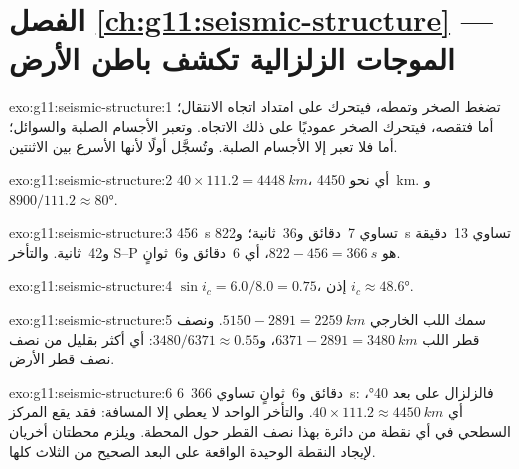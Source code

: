 \section*{الفصل \ref{ch:g11:seismic-structure} --- الموجات الزلزالية تكشف باطن الأرض}

\begin{solution}{exo:g11:seismic-structure:1}
 تضغط الصخر وتمطه، فيتحرك على امتداد اتجاه
الانتقال؛ أما  فتقصه، فيتحرك الصخر عموديًا على ذلك
الاتجاه. وتعبر  الأجسام الصلبة والسوائل؛ أما  فلا تعبر إلا الأجسام الصلبة. وتُسجَّل
 أولًا لأنها الأسرع بين الاثنتين.
\end{solution}

\begin{solution}{exo:g11:seismic-structure:2}
$40 \times 111.2 = \qty{4448}{km}$، أي نحو \qty{4450}{km}. و$8900/111.2
\approx \ang{80}$.
\end{solution}

\begin{solution}{exo:g11:seismic-structure:3}
\qty{456}{s} تساوي 7~دقائق و36~ثانية؛ و\qty{822}{s} تساوي 13~دقيقة
و42~ثانية. والتأخر S--P هو $822 - 456 = \qty{366}{s}$، أي 6~دقائق
و6~ثوانٍ.
\end{solution}

\begin{solution}{exo:g11:seismic-structure:4}
$\sin i_c = 6.0/8.0 = 0.75$، إذن $i_c \approx \ang{48.6}$.
\end{solution}

\begin{solution}{exo:g11:seismic-structure:5}
سمك اللب الخارجي $5150 - 2891 = \qty{2259}{km}$. ونصف قطر اللب
$6371 - 2891 = \qty{3480}{km}$، و$3480/6371 \approx 0.55$: أي أكثر بقليل
من نصف نصف قطر الأرض.
\end{solution}

\begin{solution}{exo:g11:seismic-structure:6}
6~دقائق و6~ثوانٍ تساوي \qty{366}{s}: فالزلزال على بعد \ang{40}، أي
$40 \times 111.2 \approx \qty{4450}{km}$. والتأخر الواحد لا يعطي إلا
المسافة: فقد يقع المركز السطحي في أي نقطة من دائرة بهذا نصف القطر حول
المحطة. ويلزم محطتان أخريان لإيجاد النقطة الوحيدة الواقعة على البعد
الصحيح من الثلاث كلها.
\end{solution}

